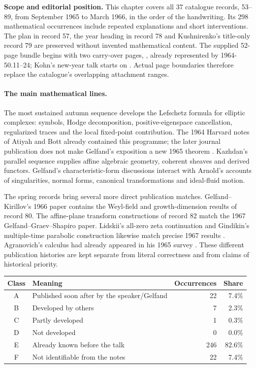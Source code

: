 \noindent\textbf{Scope and editorial position.}
This chapter covers all 37 catalogue records, 53--89, from September 1965 to
March 1966, in the order of the handwriting. Its 298 mathematical
occurrences include repeated explanations and short interventions. The plan
in record 57, the year heading in record 78 and Kushnirenko's title-only
record 79 are preserved without invented mathematical content.
The supplied 52-page bundle begins with two carry-over pages,
, already represented by 1964-50.11--24;
Kohn's new-year talk starts on . Actual page boundaries
therefore replace the catalogue's overlapping attachment ranges.

\paragraph{The main mathematical lines.}
The most sustained autumn sequence develops the Lefschetz formula for
elliptic complexes: symbols, Hodge decomposition, positive-eigenspace
cancellation, regularized traces and the local fixed-point contribution.
The 1964 Harvard notes of Atiyah and Bott already contained this programme;
the later journal publication does not make Gelfand's exposition a new
1965 theorem \citep{atiyahbott1964notes,atiyahbott1967lefschetz}.
Kazhdan's parallel sequence supplies affine algebraic geometry, coherent
sheaves and derived functors. Gelfand's characteristic-form discussions
interact with Arnold's accounts of singularities, normal forms, canonical
transformations and ideal-fluid motion.

The spring records bring several more direct publication matches.
Gelfand--Kirillov's 1966 paper contains the Weyl-field and growth-dimension
results of record 80. The affine-plane transform constructions of record 82
match the 1967 Gelfand--Graev--Shapiro paper. Lidskii's all-zero zeta
continuation and Gindikin's multiple-time parabolic construction likewise
match precise 1967 results \citep{gelfandkirillov1966corps,gelfand1967planes,
lidskii1967zeros,gindikin1967multitime}. Agranovich's calculus had already
appeared in his 1965 survey \citep{agranovich1965elliptic}. These different
publication histories are kept separate from literal correctness and from
claims of historical priority.

\begin{center}
\begin{tabular}{@{}clrr@{}}
\toprule Class & Meaning & Occurrences & Share\\\midrule
A & Published soon after by the speaker/Gelfand & 22 & 7.4\%\\
B & Developed by others & 7 & 2.3\%\\
C & Partly developed & 1 & 0.3\%\\
D & Not developed & 0 & 0.0\%\\
E & Already known before the talk & 246 & 82.6\%\\
F & Not identifiable from the notes & 22 & 7.4\%\\
\bottomrule
\end{tabular}
\end{center}

